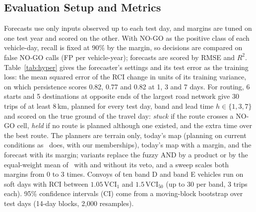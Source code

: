 \documentclass[conference]{IEEEtran}
\begin{document}
\subsection{Evaluation Setup and Metrics}
Forecasts use only inputs observed up to each test day, and margins are tuned on one test year
and scored on the other. With NO-GO as the positive class of each vehicle-day, recall
is fixed at 90\% by the margin, so decisions are compared on false NO-GO calls (FP per
vehicle-year); forecasts are scored by RMSE and $R^2$. Table~\ref{tab:hyper} gives the forecaster's settings
and its test error as the training loss: the mean squared error of the RCI change in units of its
training variance, on which persistence scores 0.82, 0.77 and 0.82 at 1, 3 and 7 days. For routing, 6 starts and 5 destinations at opposite ends of the largest road
network give 30 trips of at least 8\,km, planned for every test day, band and lead time
$h \in \{1,3,7\}$ and scored on the true ground of the travel day: \emph{stuck} if the route
crosses a NO-GO cell, \emph{held} if no route is planned although one existed, and the extra
time over the best route. The planners are terrain only, today's map (planning on current conditions
as~\cite{liu2025} does, with our memberships), today's map with a margin, and the forecast with
its margin; variants replace the fuzzy AND by a product or by the equal-weight mean
of~\cite{liu2025} with and without its veto, and a sweep scales both margins from 0 to 3 times. Convoys of ten band D and band E vehicles run on soft days with RCI between
$1.05\,\mathrm{VCI}_1$ and $1.5\,\mathrm{VCI}_{50}$ (up to 30 per band, 3 trips each). 95\%
confidence intervals (CI) come from a moving-block bootstrap over test days (14-day blocks,
2,000 resamples).
\end{document}
